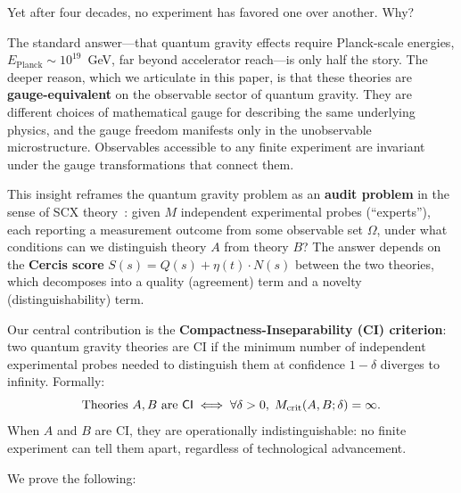 \documentclass[12pt,a4paper]{article}
\theoremstyle{remark}
\newcommand{\SCX}{\textsf{SCX}}
\newcommand{\CI}{\textsf{CI}}
\begin{document}
Yet after four decades, no experiment has favored one over another. Why?

The standard answer---that quantum gravity effects require Planck-scale energies, $E_{\text{Planck}} \sim 10^{19}$~GeV, far beyond accelerator reach---is only half the story. The deeper reason, which we articulate in this paper, is that these theories are \textbf{gauge-equivalent} on the observable sector of quantum gravity. They are different choices of mathematical gauge for describing the same underlying physics, and the gauge freedom manifests only in the unobservable microstructure. Observables accessible to any finite experiment are invariant under the gauge transformations that connect them.

This insight reframes the quantum gravity problem as an \textbf{audit problem} in the sense of \SCX{} theory~\cite{scx_theory}: given $M$ independent experimental probes (``experts''), each reporting a measurement outcome from some observable set $\Omega$, under what conditions can we distinguish theory $A$ from theory $B$? The answer depends on the \textbf{Cercis score} $S(s) = Q(s) + \eta(t) \cdot N(s)$ between the two theories, which decomposes into a quality (agreement) term and a novelty (distinguishability) term.

Our central contribution is the \textbf{Compactness-Inseparability (CI) criterion}: two quantum gravity theories are \CI{} if the minimum number of independent experimental probes needed to distinguish them at confidence $1-\delta$ diverges to infinity. Formally:
\begin{equation}
  \label{eq:ci_def}
  \text{Theories } A, B \text{ are \CI} \iff \forall \delta > 0,\;
  M_{\text{crit}}(A,B;\delta) = \infty.
\end{equation}
When $A$ and $B$ are \CI, they are operationally indistinguishable: no finite experiment can tell them apart, regardless of technological advancement.

We prove the following:
\end{document}
